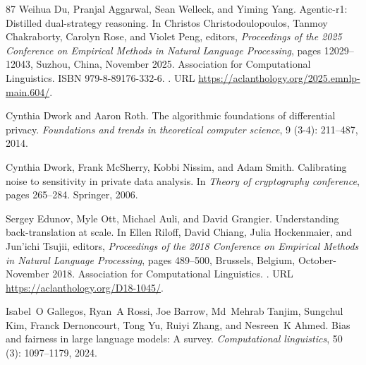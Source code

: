 \begin{thebibliography}{87}
Weihua Du, Pranjal Aggarwal, Sean Welleck, and Yiming Yang.
\newblock Agentic-r1: Distilled dual-strategy reasoning.
\newblock In Christos Christodoulopoulos, Tanmoy Chakraborty, Carolyn Rose, and Violet Peng, editors, \emph{Proceedings of the 2025 Conference on Empirical Methods in Natural Language Processing}, pages 12029--12043, Suzhou, China, November 2025. Association for Computational Linguistics.
\newblock ISBN 979-8-89176-332-6.
\newblock {}.
\newblock URL \url{https://aclanthology.org/2025.emnlp-main.604/}.

Cynthia Dwork and Aaron Roth.
\newblock The algorithmic foundations of differential privacy.
\newblock \emph{Foundations and trends{\textregistered} in theoretical computer science}, 9 (3-4): 211--487, 2014.

Cynthia Dwork, Frank McSherry, Kobbi Nissim, and Adam Smith.
\newblock Calibrating noise to sensitivity in private data analysis.
\newblock In \emph{Theory of cryptography conference}, pages 265--284. Springer, 2006.

Sergey Edunov, Myle Ott, Michael Auli, and David Grangier.
\newblock Understanding back-translation at scale.
\newblock In Ellen Riloff, David Chiang, Julia Hockenmaier, and Jun{'}ichi Tsujii, editors, \emph{Proceedings of the 2018 Conference on Empirical Methods in Natural Language Processing}, pages 489--500, Brussels, Belgium, October-November 2018. Association for Computational Linguistics.
\newblock {}.
\newblock URL \url{https://aclanthology.org/D18-1045/}.

Isabel~O Gallegos, Ryan~A Rossi, Joe Barrow, Md~Mehrab Tanjim, Sungchul Kim, Franck Dernoncourt, Tong Yu, Ruiyi Zhang, and Nesreen~K Ahmed.
\newblock Bias and fairness in large language models: A survey.
\newblock \emph{Computational linguistics}, 50 (3): 1097--1179, 2024.


\end{thebibliography}

